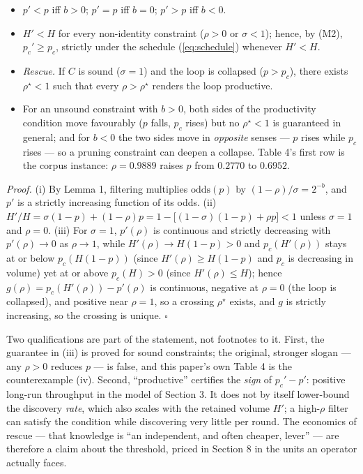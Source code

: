 \documentclass[11pt]{article}
\begin{document}
\begin{itemize}
\item[(i)] $p' < p$ iff $b > 0$; $p' = p$ iff $b = 0$; $p' > p$ iff $b < 0$.
\item[(ii)] $H' < H$ for every non-identity constraint ($\rho > 0$ or
$\sigma < 1$); hence, by (M2), $p_c' \geq p_c$, strictly under the schedule
(\ref{eq:schedule}) whenever $H' < H$.
\item[(iii)] \emph{Rescue.} If $C$ is sound ($\sigma = 1$) and the loop is
collapsed ($p > p_c$), there exists $\rho^\star < 1$ such that every
$\rho > \rho^\star$ renders the loop productive.
\item[(iv)] For an unsound constraint with $b > 0$, both sides of the
productivity condition move favourably ($p$ falls, $p_c$ rises) but no
$\rho^\star < 1$ is guaranteed in general; and for $b < 0$ the two sides
move in \emph{opposite} senses --- $p$ rises while $p_c$ rises --- so a
pruning constraint can deepen a collapse. Table 4's first row is the corpus
instance: $\rho = 0.9889$ raises $p$ from $0.2770$ to $0.6952$.
\end{itemize}

\noindent\emph{Proof.} (i) By Lemma 1, filtering multiplies
$\mathrm{odds}(p)$ by $(1-\rho)/\sigma = 2^{-b}$, and $p'$ is a strictly
increasing function of its odds. (ii) $H'/H = \sigma(1-p) + (1-\rho)p
= 1 - \big[(1-\sigma)(1-p) + \rho p\big] < 1$ unless $\sigma = 1$ and
$\rho = 0$. (iii) For $\sigma = 1$, $p'(\rho)$ is continuous and strictly
decreasing with $p'(\rho) \to 0$ as $\rho \to 1$, while
$H'(\rho) \to H(1-p) > 0$ and $p_c(H'(\rho))$ stays at or below
$p_c(H(1-p))$ (since $H'(\rho) \geq H(1-p)$ and $p_c$ is decreasing in
volume) yet at or above $p_c(H) > 0$ (since $H'(\rho) \leq H$); hence
$g(\rho) = p_c(H'(\rho)) - p'(\rho)$ is continuous,
negative at $\rho = 0$ (the loop is collapsed), and positive near
$\rho = 1$, so a crossing $\rho^\star$ exists, and $g$ is strictly
increasing, so the crossing is unique. \hfill$\square$

Two qualifications are part of the statement, not footnotes to it. First,
the guarantee in (iii) is proved for sound constraints; the original,
stronger slogan --- any $\rho > 0$ reduces $p$ --- is false, and this
paper's own Table 4 is the counterexample (iv). Second, ``productive''
certifies the \emph{sign} of $p_c' - p'$: positive long-run throughput in
the model of Section 3. It does not by itself lower-bound the discovery
\emph{rate}, which also scales with the retained volume $H'$; a
high-$\rho$ filter can satisfy the condition while discovering very little
per round. The economics of rescue --- that knowledge is ``an independent,
and often cheaper, lever'' --- are therefore a claim about the threshold,
priced in Section 8 in the units an operator actually faces.
\end{document}
